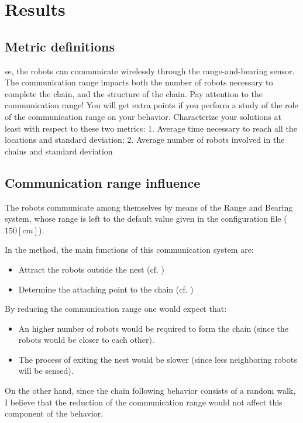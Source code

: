 \section{Results} \label{results}
\subsection{Metric definitions}\label{subsec:metric}
se, the robots can communicate wirelessly through
the range-and-bearing sensor. The communication range impacts both the number of robots necessary to complete the chain, and the structure of the chain.
Pay attention to the communication range! You will get extra points if you
perform a study of the role of the communication range on your behavior.
Characterize your solutions at least with respect to these two metrics:
1. Average time necessary to reach all the locations and standard deviation;
2. Average number of robots involved in the chains and standard deviation 

\subsection{Communication range influence}\label{subsec:comrange}
The robots communicate among themselves by means of the Range and Bearing 
system, whose range is left to the default value given in the configuration file 
($150[cm]$).

In the method, the main functions of this communication system are:
\begin{itemize}
  \item Attract the robots outside the nest (cf. )
  \item Determine the attaching point to the chain (cf. )
\end{itemize}

By reducing the communication range one would expect that:
\begin{itemize}
  \item An higher number of robots would be required to form the 
chain (since the robots would be closer to each other).
\item The process of exiting the nest would be slower (since less neighboring robots will be sensed).
\end{itemize}
On the other hand, since the chain following behavior consists of a random walk, 
I believe that the reduction of the communication range would not affect this 
component of the behavior.

